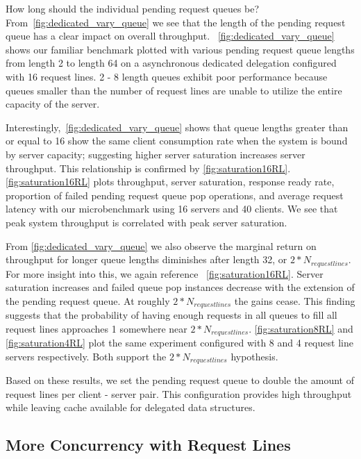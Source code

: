 \documentclass{uicthesi}
\begin{document}
How long should the individual pending request queues be? From~\ref{fig:dedicated_vary_queue} we see that the length of the pending request queue has a clear impact on overall throughput. ~\ref{fig:dedicated_vary_queue} shows our familiar benchmark plotted with various pending request queue lengths from length 2 to length 64 on a asynchronous dedicated delegation configured with 16 request lines. 2 - 8 length queues exhibit poor performance because queues smaller than the number of request lines are unable to utilize the entire capacity of the server. 

Interestingly,~\ref{fig:dedicated_vary_queue} shows that queue lengths greater than or equal to 16 show the same client consumption rate when the system is bound by server capacity; suggesting higher server saturation increases server throughput.  This relationship is confirmed by \ref{fig:saturation16RL}. \ref{fig:saturation16RL} plots throughput, server saturation, response ready rate, proportion of failed pending request queue pop operations, and average request latency with our microbenchmark using 16 servers and 40 clients. We see that peak system throughput is correlated with peak server saturation. 

From \ref{fig:dedicated_vary_queue} we also observe the marginal return on throughput for longer queue lengths diminishes after length 32, or $2 * N_{request lines}$. For more insight into this, we again reference ~\ref{fig:saturation16RL}. Server saturation increases and failed queue pop instances decrease with the extension of the pending request queue. At roughly $2 * N_{request lines}$ the gains cease. This finding suggests that the probability of having enough requests in all queues to fill all request lines approaches 1 somewhere near $2 * N_{request lines}$. \ref{fig:saturation8RL} and \ref{fig:saturation4RL} plot the same experiment configured with 8 and 4 request line servers respectively. Both support the $2 * N_{request lines}$ hypothesis. 

Based on these results, we set the pending request queue to double the amount of request lines per client - server pair. This configuration provides high throughput while leaving cache available for delegated data structures. 

\subsection{More Concurrency with Request Lines}
\end{document}
